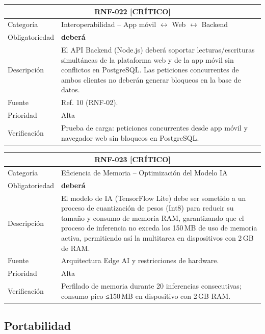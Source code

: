 \documentclass[12pt, a4paper]{article}
\newcommand{\criticomark}{\textcolor{criticolor}{\textbf{[CR\'ITICO]}}}
\begin{document}
\begin{longtable}{|p{3cm}|p{11.5cm}|}
\hline
\multicolumn{2}{|c|}{\textbf{RNF-022} \criticomark} \\
\hline
Categor\'ia & Interoperabilidad -- App m\'ovil $\leftrightarrow$ Web $\leftrightarrow$ Backend \\
\hline
Obligatoriedad & \textbf{deber\'a} \\
\hline
Descripci\'on & El API Backend (Node.js) deber\'a soportar lecturas/escrituras simult\'aneas de la plataforma web y de la app m\'ovil sin conflictos en PostgreSQL. Las peticiones concurrentes de ambos clientes no deber\'an generar bloqueos en la base de datos. \\
\hline
Fuente & Ref. 10 (RNF-02). \\
\hline
Prioridad & Alta \\
\hline
Verificaci\'on & Prueba de carga: peticiones concurrentes desde app m\'ovil y navegador web sin bloqueos en PostgreSQL. \\
\hline
\end{longtable}

\begin{longtable}{|p{3cm}|p{11.5cm}|}
\hline
\multicolumn{2}{|c|}{\textbf{RNF-023} \criticomark} \\
\hline
Categoría & Eficiencia de Memoria -- Optimización del Modelo IA \\
\hline
Obligatoriedad & \textbf{deberá} \\
\hline
Descripción & El modelo de IA (TensorFlow Lite) debe ser sometido a un proceso de cuantización de pesos (Int8) para reducir su tamaño y consumo de memoria RAM, garantizando que el proceso de inferencia no exceda los 150 MB de uso de memoria activa, permitiendo así la multitarea en dispositivos con 2 GB de RAM. \\
\hline
Fuente & Arquitectura Edge AI y restricciones de hardware. \\
\hline
Prioridad & Alta \\
\hline
Verificación & Perfilado de memoria durante 20 inferencias consecutivas; consumo pico ≤150 MB en dispositivo con 2 GB RAM. \\
\hline
\end{longtable}


\subsection{Portabilidad}
\end{document}
